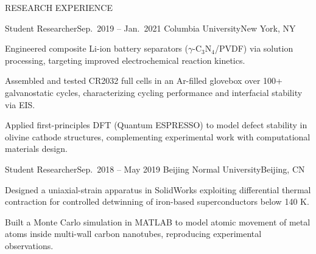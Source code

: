 \documentclass{resume} %
\begin{document}
\begin{rSection}{RESEARCH EXPERIENCE}
\begin{rSubsection}
{Student Researcher}{Sep.\ 2019 -- Jan.\ 2021}
{Columbia University}{New York, NY}
\item Engineered composite Li-ion battery separators ($\gamma$-C$_3$N$_4$/PVDF) via solution processing, targeting improved electrochemical reaction kinetics.
\item Assembled and tested CR2032 full cells in an Ar-filled glovebox over 100+ galvanostatic cycles, characterizing cycling performance and interfacial stability via EIS.
\item Applied first-principles DFT (Quantum ESPRESSO) to model defect stability in olivine cathode structures, complementing experimental work with computational materials design.
\end{rSubsection}

\begin{rSubsection}
{Student Researcher}{Sep.\ 2018 -- May 2019}
{Beijing Normal University}{Beijing, CN}
\item Designed a uniaxial-strain apparatus in SolidWorks exploiting differential thermal contraction for controlled detwinning of iron-based superconductors below 140 K.
\item Built a Monte Carlo simulation in MATLAB to model atomic movement of metal atoms inside multi-wall carbon nanotubes, reproducing experimental observations.
\end{rSubsection}

\end{rSection}

\end{document}
